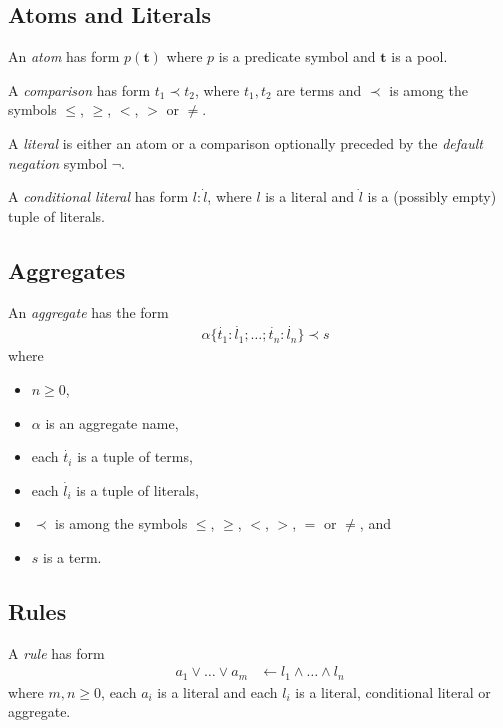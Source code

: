 \documentclass{article}
\newcommand{\pool}[1]{\boldsymbol{#1}}
\newcommand{\tuple}[1]{\dot{#1}}
\begin{document}
	\subsection{Atoms and Literals}

	An \emph{atom} has form $p(\pool{t})$ where $p$ is a predicate symbol and $\pool{t}$ is a pool.

	A \emph{comparison} has form $t_1 \prec t_2$, where $t_1,t_2$ are terms and $\prec$ is among the symbols $\leq$, $\ge$, $<$, $>$ or $\neq$.

	A \emph{literal} is either an atom or a comparison optionally preceded by the \emph{default negation} symbol $\neg$.

	A \emph{conditional literal} has form $l : \tuple{l}$, where $l$ is a literal and $\tuple{l}$ is a (possibly empty) tuple of literals.

	\subsection{Aggregates}
	An \emph{aggregate} has the form
	\begin{align}
		&\alpha\{\tuple{t_1} : \tuple{l_1}; \dots; \tuple{t_n} : \tuple{l_n}\} \prec s \label{aggregate1}
	\end{align}
	where
	\begin{itemize}
		\item $n \geq 0$,
		\item $\alpha$ is an aggregate name,
		\item each $\tuple{t_i}$ is a tuple of terms,
		\item each $\tuple{l_i}$ is a tuple of literals,
		\item $\prec$ is among the symbols $\leq$, $\ge$, $<$, $>$, $=$ or $\neq$, and
		\item $s$ is a term.
	\end{itemize}

	\subsection{Rules}

	A \emph{rule} has form
	\begin{align}
		a_1 \vee \dots \vee a_m &\leftarrow l_1 \wedge \dots \wedge l_n \label{rule}
	\end{align}
	where $m, n \ge 0$, each $a_i$ is a literal and each $l_i$ is a literal, conditional literal or aggregate.
\end{document}
